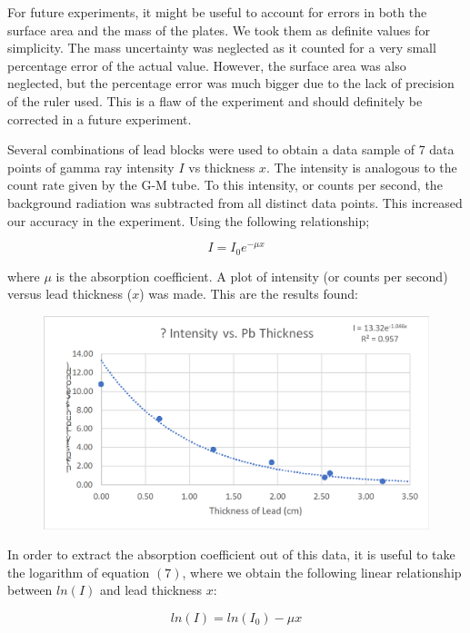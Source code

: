 \documentclass[a4paper]{article}
\begin{document}
  For future experiments, it might be useful to account for errors in both the surface area and the mass of the plates. We took them as definite values for simplicity. The mass uncertainty was neglected as it counted for a very small percentage error of the actual value. However, the surface area was also neglected, but the percentage error was much bigger due to the lack of precision of the ruler used. This is a flaw of the experiment and should definitely be corrected in a future experiment.
  
  Several combinations of lead blocks were used to obtain a data sample of 7 data points of gamma ray intensity $I$ vs thickness $x$. The intensity is analogous to the count rate given by the G-M tube. To this intensity, or counts per second, the background radiation was subtracted from all distinct data points. This increased our accuracy in the experiment. Using the following relationship;
  
    \begin{equation}
  I=I_{0}e^{-\mu x}
  \end{equation}
  
  where $\mu$ is the absorption coefficient. A plot of intensity (or counts per second) versus lead thickness ($x$) was made. This are the results found:
  
   \begin{figure}[h]
   \centering
  \includegraphics[scale=0.5]{ivsx} 
  \end{figure}
  
  In order to extract the absorption coefficient out of this data, it is useful to take the logarithm of equation $(7)$, where we obtain the following linear relationship between $ln(I)$ and lead thickness $x$:
  
    \begin{equation}
  ln(I)=ln(I_0)-\mu x
  \end{equation}
  
\end{document}
